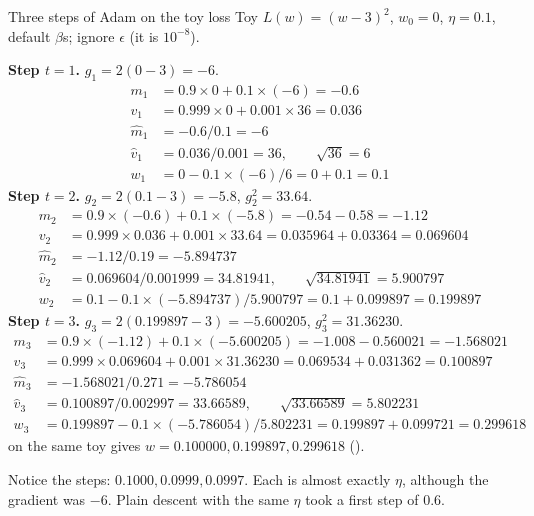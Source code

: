 \begin{worked}[label={we:trainloop:adam}]{Three steps of Adam on the toy loss}
Toy $L(w) = (w - 3)^2$, $w_0 = 0$, $\eta = 0.1$, default $\beta$s; ignore $\epsilon$ (it is
$10^{-8}$).

\textbf{Step $t = 1$.} $g_1 = 2(0 - 3) = -6$.
\begin{align*}
m_1 &= 0.9 \times 0 + 0.1 \times (-6) = -0.6\\
v_1 &= 0.999 \times 0 + 0.001 \times 36 = 0.036\\
\hat{m}_1 &= -0.6 / 0.1 = -6\\
\hat{v}_1 &= 0.036 / 0.001 = 36, \qquad \sqrt{36} = 6\\
w_1 &= 0 - 0.1 \times (-6)/6 = 0 + 0.1 = 0.1
\end{align*}
\textbf{Step $t = 2$.} $g_2 = 2(0.1 - 3) = -5.8$, $g_2^2 = 33.64$.
\begin{align*}
m_2 &= 0.9 \times (-0.6) + 0.1 \times (-5.8) = -0.54 - 0.58 = -1.12\\
v_2 &= 0.999 \times 0.036 + 0.001 \times 33.64 = 0.035964 + 0.03364 = 0.069604\\
\hat{m}_2 &= -1.12 / 0.19 = -5.894737\\
\hat{v}_2 &= 0.069604 / 0.001999 = 34.81941, \qquad \sqrt{34.81941} = 5.900797\\
w_2 &= 0.1 - 0.1 \times (-5.894737)/5.900797 = 0.1 + 0.099897 = 0.199897
\end{align*}
\textbf{Step $t = 3$.} $g_3 = 2(0.199897 - 3) = -5.600205$, $g_3^2 = 31.36230$.
\begin{align*}
m_3 &= 0.9 \times (-1.12) + 0.1 \times (-5.600205) = -1.008 - 0.560021 = -1.568021\\
v_3 &= 0.999 \times 0.069604 + 0.001 \times 31.36230 = 0.069534 + 0.031362 = 0.100897\\
\hat{m}_3 &= -1.568021 / 0.271 = -5.786054\\
\hat{v}_3 &= 0.100897 / 0.002997 = 33.66589, \qquad \sqrt{33.66589} = 5.802231\\
w_3 &= 0.199897 - 0.1 \times (-5.786054)/5.802231 = 0.199897 + 0.099721 = 0.299618
\end{align*}
 on the same toy gives $w = 0.100000, 0.199897, 0.299618$ \tagC
().

Notice the steps: $0.1000, 0.0999, 0.0997$. Each is almost exactly $\eta$, although the
gradient was $-6$. Plain descent with the same $\eta$ took a first step of $0.6$.
\end{worked}

